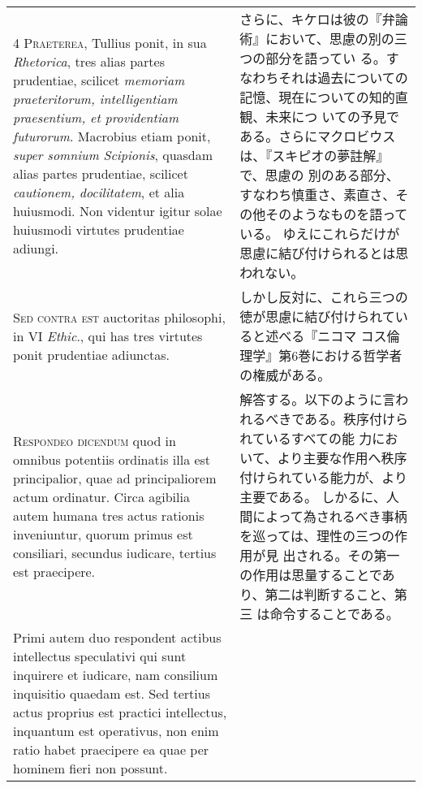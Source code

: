 \documentclass[10pt]{jsarticle}
\begin{document}
\begin{longtable}{p{21em}p{21em}}
\\

4 {\scshape Praeterea}, Tullius ponit, in sua {\itshape Rhetorica},
tres alias partes prudentiae, scilicet {\itshape memoriam
praeteritorum, intelligentiam praesentium, et providentiam
futurorum}. Macrobius etiam ponit, {\itshape super somnium Scipionis},
quasdam alias partes prudentiae, scilicet {\itshape cautionem,
docilitatem}, et alia huiusmodi. Non videntur igitur solae huiusmodi
virtutes prudentiae adiungi.

&

さらに、キケロは彼の『弁論術』において、思慮の別の三つの部分を語ってい
る。すなわちそれは過去についての記憶、現在についての知的直観、未来につ
いての予見である。さらにマクロビウスは、『スキピオの夢註解』で、思慮の
別のある部分、すなわち慎重さ、素直さ、その他そのようなものを語っている。
ゆえにこれらだけが思慮に結び付けられるとは思われない。

\\

{\scshape Sed contra est} auctoritas philosophi, in VI {\itshape
Ethic}., qui has tres virtutes ponit prudentiae adiunctas.

&

しかし反対に、これら三つの徳が思慮に結び付けられていると述べる『ニコマ
コス倫理学』第6巻における哲学者の権威がある。

\\

{\scshape Respondeo dicendum} quod in omnibus potentiis ordinatis illa
est principalior, quae ad principaliorem actum ordinatur. Circa
agibilia autem humana tres actus rationis inveniuntur, quorum primus
est consiliari, secundus iudicare, tertius est praecipere.

&

解答する。以下のように言われるべきである。秩序付けられているすべての能
力において、より主要な作用へ秩序付けられている能力が、より主要である。
しかるに、人間によって為されるべき事柄を巡っては、理性の三つの作用が見
出される。その第一の作用は思量することであり、第二は判断すること、第三
は命令することである。

\\

Primi autem duo respondent actibus intellectus speculativi qui sunt
inquirere et iudicare, nam consilium inquisitio quaedam est. Sed
tertius actus proprius est practici intellectus, inquantum est
operativus, non enim ratio habet praecipere ea quae per hominem fieri
non possunt.


\end{longtable}
\end{document}
